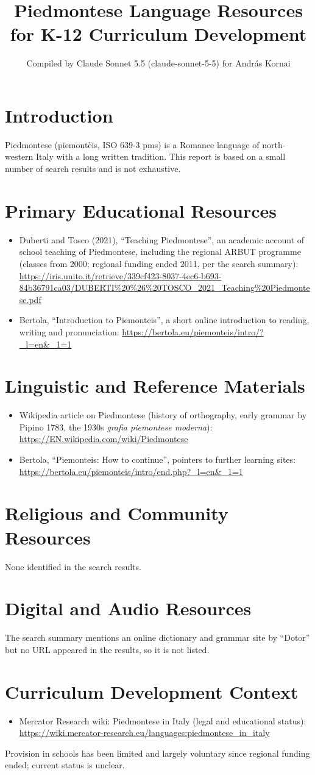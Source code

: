 \documentclass[12pt]{article}
\title{Piedmontese Language Resources for K-12 Curriculum Development}
\author{Compiled by Claude Sonnet 5.5 (claude-sonnet-5-5) for Andr\'as Kornai}
\date{}
\begin{document}
\maketitle
\section{Introduction}
Piedmontese (piemont\`eis, ISO 639-3 pms) is a Romance language of north-western Italy with a long written tradition. This report is based on a small number of search results and is not exhaustive.
\section{Primary Educational Resources}
\begin{itemize}
\item Duberti and Tosco (2021), ``Teaching Piedmontese'', an academic account of school teaching of Piedmontese, including the regional ARBUT programme (classes from 2000; regional funding ended 2011, per the search summary): \url{https://iris.unito.it/retrieve/339cf423-8037-4ec6-b693-84b36791ca03/DUBERTI%20%26%20TOSCO_2021_Teaching%20Piedmontese.pdf}
\item Bertola, ``Introduction to Piemonteis'', a short online introduction to reading, writing and pronunciation: \url{https://bertola.eu/piemonteis/intro/?_l=en&_1=1}
\end{itemize}
\section{Linguistic and Reference Materials}
\begin{itemize}
\item Wikipedia article on Piedmontese (history of orthography, early grammar by Pipino 1783, the 1930s \emph{grafia piemontese moderna}): \url{https://EN.wikipedia.com/wiki/Piedmontese}
\item Bertola, ``Piemonteis: How to continue'', pointers to further learning sites: \url{https://bertola.eu/piemonteis/intro/end.php?_l=en&_1=1}
\end{itemize}
\section{Religious and Community Resources}
None identified in the search results.
\section{Digital and Audio Resources}
The search summary mentions an online dictionary and grammar site by ``Dotor'' but no URL appeared in the results, so it is not listed.
\section{Curriculum Development Context}
\begin{itemize}
\item Mercator Research wiki: Piedmontese in Italy (legal and educational status): \url{https://wiki.mercator-research.eu/languages:piedmontese_in_italy}
\end{itemize}
Provision in schools has been limited and largely voluntary since regional funding ended; current status is unclear.
\end{document}
